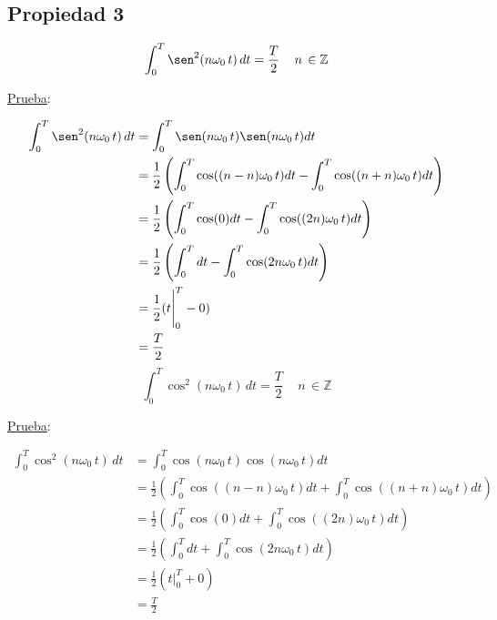 \subsection*{Propiedad 3}
\begin{equation}
    \int_{0}^{T}\sen^2(n\omega_0\,t)\,dt=\frac{T}{2}\quad\,n\,\in\mathbb{Z}
\end{equation}

\underline{Prueba}:

\begin{equation*}
\begin{split}
    \int_{0}^{T}\sen^2(n\omega_0\,t)\,dt
        &=\int_{0}^{T}\sen(n\omega_0\,t)\sen(n\omega_0\,t)dt\\
        &=\frac{1}{2}\left(\int_{0}^{T}\cos((n-n)\omega_0\,t)dt-
          \int_{0}^{T}\cos((n+n)\omega_0\,t)dt\right)\\
        &=\frac{1}{2}\left(\int_{0}^{T}\cos(0)dt-
          \int_{0}^{T}\cos((2n)\omega_0\,t)dt\right)\\
        &=\frac{1}{2}\left(\int_{0}^{T}dt-
          \int_{0}^{T}\cos(2n\omega_0\,t)dt\right)\\
        &=\frac{1}{2}(t\Biggr|_0^T-0)\\
        &=\frac{T}{2}\\
\end{split}
\end{equation*}
\begin{equation}
    \int_{0}^{T}\cos^2(n\omega_0\,t)\,dt=\frac{T}{2}\quad\,n\,\in\mathbb{Z}
\end{equation}

\underline{Prueba}:

\begin{equation*}
\begin{split}
    \int_{0}^{T}\cos^2(n\omega_0\,t)\,dt
        &=\int_{0}^{T}\cos(n\omega_0\,t)\cos(n\omega_0\,t)dt\\
        &=\frac{1}{2}\left(\int_{0}^{T}\cos((n-n)\omega_0\,t)dt+
          \int_{0}^{T}\cos((n+n)\omega_0\,t)dt\right)\\
        &=\frac{1}{2}\left(\int_{0}^{T}\cos(0)dt+
          \int_{0}^{T}\cos((2n)\omega_0\,t)dt\right)\\
        &=\frac{1}{2}\left(\int_{0}^{T}dt+
          \int_{0}^{T}\cos(2n\omega_0\,t)dt\right)\\
        &=\frac{1}{2}(t\Biggr|_0^T+0)\\
        &=\frac{T}{2}\\
\end{split}
\end{equation*}

